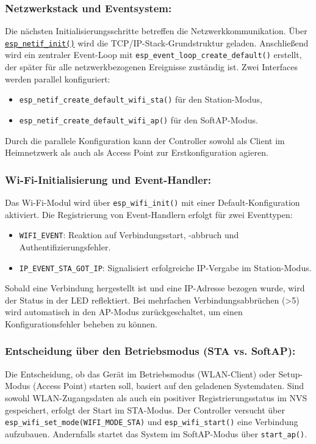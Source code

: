 \subsubsection{Netzwerkstack und Eventsystem:}  
Die nächsten Initialisierungsschritte betreffen die Netzwerkkommunikation. Über \texttt{\url{esp\_netif\_init()}} wird die TCP/IP-Stack-Grundstruktur geladen. Anschließend wird ein zentraler Event-Loop mit \texttt{esp\_event\_loop\_create\_default()} erstellt, der später für alle netzwerkbezogenen Ereignisse zuständig ist. Zwei Interfaces werden parallel konfiguriert:
\begin{itemize}
	\item \texttt{esp\_netif\_create\_default\_wifi\_sta()} für den Station-Modus,
	\item \texttt{esp\_netif\_create\_default\_wifi\_ap()} für den SoftAP-Modus.
\end{itemize}
Durch die parallele Konfiguration kann der Controller sowohl als Client im Heimnetzwerk als auch als Access Point zur Erstkonfiguration agieren.

\subsubsection{Wi-Fi-Initialisierung und Event-Handler:}  
Das Wi-Fi-Modul wird über \texttt{esp\_wifi\_init()} mit einer Default-Konfiguration aktiviert. Die Registrierung von Event-Handlern erfolgt für zwei Eventtypen:
\begin{itemize}
	\item \texttt{WIFI\_EVENT}: Reaktion auf Verbindungsstart, -abbruch und Authentifizierungsfehler.
	\item \texttt{IP\_EVENT\_STA\_GOT\_IP}: Signalisiert erfolgreiche IP-Vergabe im Station-Modus.
\end{itemize}
Sobald eine Verbindung hergestellt ist und eine IP-Adresse bezogen wurde, wird der Status in der LED reflektiert. Bei mehrfachen Verbindungsabbrüchen (>5) wird automatisch in den AP-Modus zurückgeschaltet, um einen Konfigurationsfehler beheben zu können.

\subsubsection{Entscheidung über den Betriebsmodus (STA vs. SoftAP):}  
Die Entscheidung, ob das Gerät im Betriebsmodus (WLAN-Client) oder Setup-Modus (Access Point) starten soll, basiert auf den geladenen Systemdaten. Sind sowohl WLAN-Zugangsdaten als auch ein positiver Registrierungsstatus im NVS gespeichert, erfolgt der Start im STA-Modus. Der Controller versucht über \texttt{esp\_wifi\_set\_mode(WIFI\_MODE\_STA)} und \texttt{esp\_wifi\_start()} eine Verbindung aufzubauen. Andernfalls startet das System im SoftAP-Modus über \texttt{start\_ap()}.

